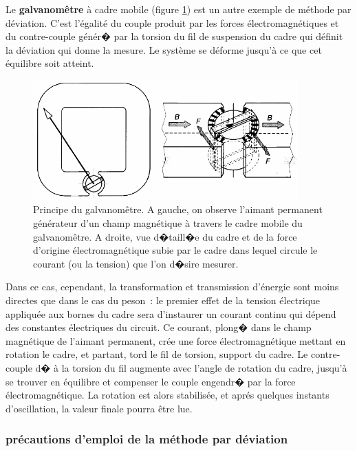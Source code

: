 \vspace{4mm}
Le \textbf{galvanomêtre} à cadre mobile (figure \ref{fig:galva}) est un autre exemple de méthode par déviation. C'est l'égalité du couple produit par les forces électromagnétiques et du contre-couple génér� par la torsion du fil de suspension du cadre qui définit la déviation qui donne la mesure. Le système se déforme jusqu'à ce que cet équilibre soit atteint.
\begin{figure}[h]
   \centering
   \includegraphics[height=4.6cm]{assets/figures/galva.pdf}
   \caption{Principe du galvanomêtre. A gauche, on observe l'aimant permanent générateur d'un champ magnétique à travers le cadre mobile du galvanomêtre. A droite, vue d�taill�e du cadre et de la force d'origine électromagnétique subie par le cadre dans lequel circule le courant (ou la tension) que l'on d�sire mesurer.}
   \label{fig:galva}
\end{figure}

Dans ce cas, cependant, la transformation et transmission d'énergie sont moins directes que dans le cas du peson~: le premier effet de la tension électrique appliquée aux bornes du cadre sera d'instaurer un courant continu qui dépend des constantes électriques du circuit. Ce courant, plong� dans le champ magnétique de l'aimant permanent, crée une force électromagnétique mettant en rotation le cadre, et partant, tord le fil de torsion, support du cadre. Le contre-couple d� à la torsion du fil augmente avec l'angle de rotation du cadre, jusqu'à se trouver en équilibre et compenser le couple engendr� par la force électromagnétique. La rotation est alors stabilisée, et aprés quelques instants d'oscillation, la valeur finale pourra être lue.

\subsubsection{précautions d'emploi de la méthode par déviation}

